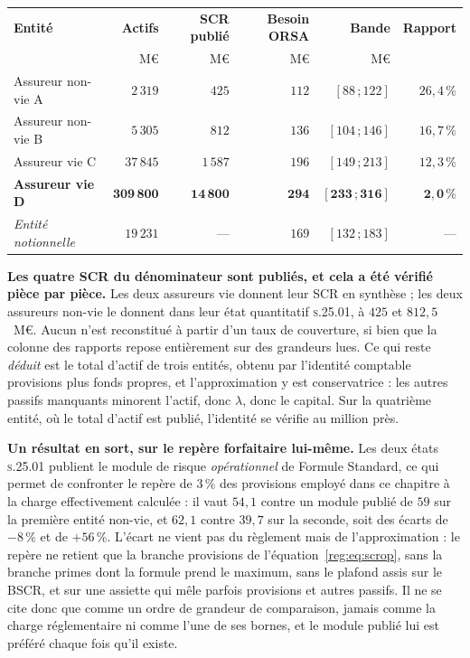\begin{center}\small
\renewcommand{\arraystretch}{1.25}
\begin{tabular}{@{}l r r r r r@{}}
\toprule
\textbf{Entité} & \textbf{Actifs} & \textbf{SCR publié} & \textbf{Besoin ORSA} &
\textbf{Bande} & \textbf{Rapport} \\
 & M\euro & M\euro & M\euro & M\euro & \\
\midrule
Assureur non-vie A & $2\,319$ & $425$ & $112$ & $[88\,;122]$ & $26{,}4\,\%$ \\
Assureur non-vie B & $5\,305$ & $812$ & $136$ & $[104\,;146]$ & $16{,}7\,\%$ \\
Assureur vie C & $37\,845$ & $1\,587$ & $196$ & $[149\,;213]$ & $12{,}3\,\%$ \\
\textbf{Assureur vie D} & $\mathbf{309\,800}$ & $\mathbf{14\,800}$ & $\mathbf{294}$ &
$\mathbf{[233\,;316]}$ & $\mathbf{2{,}0\,\%}$ \\
\midrule
\emph{Entité notionnelle} & $19\,231$ & --- & $169$ & $[132\,;183]$ & --- \\
\bottomrule
\end{tabular}
\end{center}

\vspace{2pt}
\noindent \textbf{Les quatre SCR du dénominateur sont publiés, et cela a été vérifié
pièce par pièce.} Les deux assureurs vie donnent leur SCR en synthèse ; les deux
assureurs non-vie le donnent dans leur état quantitatif \textsc{s.25.01}, à $425$ et
$812{,}5$~M\euro. Aucun n'est reconstitué à partir d'un taux de couverture, si bien que la
colonne des rapports repose entièrement sur des grandeurs lues. Ce qui reste \emph{déduit} est
le total d'actif de trois entités, obtenu par l'identité comptable provisions plus fonds
propres, et l'approximation y est conservatrice : les autres passifs manquants
minorent l'actif, donc $\lambda$, donc le capital. Sur la quatrième entité, où le total d'actif
est publié, l'identité se vérifie au million près.

\vspace{2pt}
\noindent \textbf{Un résultat en sort, sur le repère forfaitaire lui-même.} Les deux états
\textsc{s.25.01} publient le module de risque \emph{opérationnel} de Formule Standard, ce qui
permet de confronter le repère de $3\,\%$ des provisions employé dans ce chapitre à la charge
effectivement calculée : il vaut $54{,}1$ contre un module publié de $59$ sur la première entité
non-vie, et $62{,}1$ contre $39{,}7$ sur la seconde, soit des écarts de $-8\,\%$ et de
$+56\,\%$. L'écart ne vient pas du règlement mais de l'approximation : le repère ne retient que la
branche provisions de l'équation~\eqref{reg:eq:scrop}, sans la branche primes dont la formule prend
le maximum, sans le plafond assis sur le BSCR, et sur une assiette qui mêle parfois provisions et
autres passifs. Il ne se cite donc que comme un ordre de grandeur de comparaison, jamais comme la
charge réglementaire ni comme l'une de ses bornes, et le module publié lui est préféré chaque fois
qu'il existe.

